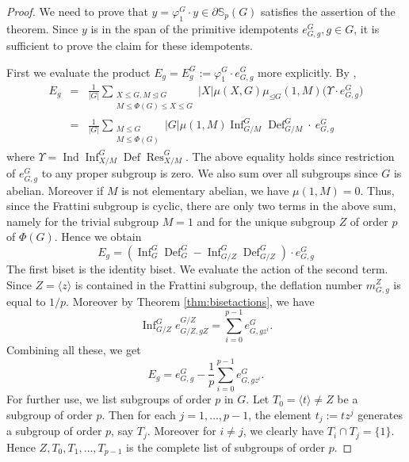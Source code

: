 \documentclass[12pt]{article}
\theoremstyle{plain}
\theoremstyle{definition}
\newcommand{\kerlin}{\mathbb S_p}
\newcommand{\ind}{\operatorname{Ind}}
\newcommand{\res}{\operatorname{Res}}
\newcommand{\defl}{\operatorname{Def}}
\newcommand{\infl}{\operatorname{Inf}}
\begin{document}
\begin{proof}
 We need to prove that $y = \varphi_1^G\cdot y\in\partial\kerlin(G)$ satisfies the assertion of the theorem. Since $y$ is in the span of the primitive idempotents $e_{G, g}^G, g\in G$, it is sufficient to prove the claim for these idempotents. 

 First we evaluate the product $E_g= E_g^G:=\varphi_1^G\cdot e_{G, g}^G$ more explicitly. By \cite[Proposition 3.6]{Bouc}, 
\begin{eqnarray*}
E_g &=& \frac{1}{|G|}\sum_{\substack{X\le G, M\unlhd G\\ M\le \Phi(G) \le X\le G}} |X| \mu(X, G)\mu_{\unlhd G}(1, M)\big(\Upsilon\cdot e_{G,g}^G\big)\\
&=& \frac{1}{|G|}\sum_{\substack{M\le G\\ M\le \Phi(G)}} |G|\mu(1, M)\infl_{G/M}^G\defl^G_{G/M} \cdot\ e_{G, g}^G
\end{eqnarray*}
where $\Upsilon =\ind\infl_{X/M}^G\defl\res^G_{X/M}
$.
The above equality holds since restriction of $e_{G, g}^G$ to any proper subgroup is zero. We also sum over all subgroups since $G$ is abelian. Moreover if $M$ is not elementary abelian, we have $\mu(1, M) = 0$. Thus, since the Frattini subgroup is cyclic, there are only two terms in the above sum, namely for the trivial subgroup $M = 1$ and for the unique subgroup $Z$ of order $p$ of $\Phi(G)$. Hence we obtain
\begin{equation}
E_g  = (\infl^G_G\defl^G_G - \infl_{G/Z}^G\defl^G_{G/Z}) \cdot e_{G, g}^G
\end{equation}
The first biset is the identity biset. We evaluate the action of the second term. Since $Z = \langle z \rangle$ is contained in the Frattini subgroup, the deflation number $m_{G, g}^Z$ is equal to $1/p$. Moreover by Theorem \ref{thm:bisetactions}, we have
\[
\infl_{G/Z}^G e_{G/Z, gZ}^{G/Z} = \sum_{i=0}^{p-1}e_{G, gz^i}^G.
\]
Combining all these, we get
\begin{equation}\label{eqn:phieee}
E_g=  e_{G, g}^G - \frac{1}{p}\sum_{i=0}^{p-1}e_{G, gz^i}^G.
\end{equation}
For further use, we list subgroups of order $p$ in $G$. 
Let $T_0=\langle t\rangle\not= Z$ be a subgroup of order $p$. Then for each $j= 1, \ldots, p-1$, the element $t_j:= tz^j$ generates a subgroup of order $p$, say $T_j$. Moreover for $i\not = j$, we clearly have $T_i \cap T_j = \{1\}$. Hence $Z, T_0, T_1, \ldots, T_{p-1}$ is the complete list of subgroups of order $p$.


\end{proof}
\end{document}
